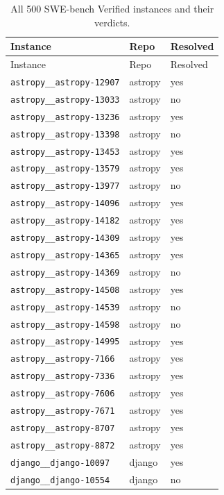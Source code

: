 \begin{longtable}{@{}p{}lp{}@{}}
\caption{All 500 SWE-bench Verified instances and their verdicts.}\label{tab:instances}\\
\toprule
Instance & Repo & Resolved \\
\midrule
\endfirsthead
\toprule Instance & Repo & Resolved \\ \midrule \endhead
\bottomrule \endfoot
\texttt{astropy\_\_astropy-12907} & astropy & yes \\
\texttt{astropy\_\_astropy-13033} & astropy & no \\
\texttt{astropy\_\_astropy-13236} & astropy & yes \\
\texttt{astropy\_\_astropy-13398} & astropy & no \\
\texttt{astropy\_\_astropy-13453} & astropy & yes \\
\texttt{astropy\_\_astropy-13579} & astropy & yes \\
\texttt{astropy\_\_astropy-13977} & astropy & no \\
\texttt{astropy\_\_astropy-14096} & astropy & yes \\
\texttt{astropy\_\_astropy-14182} & astropy & yes \\
\texttt{astropy\_\_astropy-14309} & astropy & yes \\
\texttt{astropy\_\_astropy-14365} & astropy & yes \\
\texttt{astropy\_\_astropy-14369} & astropy & no \\
\texttt{astropy\_\_astropy-14508} & astropy & yes \\
\texttt{astropy\_\_astropy-14539} & astropy & no \\
\texttt{astropy\_\_astropy-14598} & astropy & no \\
\texttt{astropy\_\_astropy-14995} & astropy & yes \\
\texttt{astropy\_\_astropy-7166} & astropy & yes \\
\texttt{astropy\_\_astropy-7336} & astropy & yes \\
\texttt{astropy\_\_astropy-7606} & astropy & yes \\
\texttt{astropy\_\_astropy-7671} & astropy & yes \\
\texttt{astropy\_\_astropy-8707} & astropy & yes \\
\texttt{astropy\_\_astropy-8872} & astropy & yes \\
\texttt{django\_\_django-10097} & django & yes \\
\texttt{django\_\_django-10554} & django & no \\

\end{longtable}
